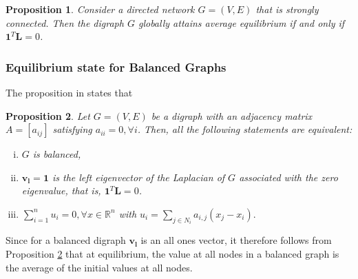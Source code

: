 \documentclass[10pt,a4paper]{article}
\newtheorem{prop}{Proposition}
\begin{document}
    \begin{prop}
    Consider a directed network $G=(V,E)$ that is strongly connected. Then the digraph $G$ globally attains average equilibrium if and only if $\mathbf{1}^T \mathbf{L}= 0$.
    \label{prop1}
    \end{prop} 

    \subsubsection{Equilibrium state for Balanced Graphs}
     The proposition in \citep{saber2003agreement} states that 
     \begin{prop}
     Let $G=(V,E)$ be a digraph with an adjacency matrix $A=[a_{ij}]$ satisfying $a_{ii}=0, \forall i$. Then, all the following statements are equivalent:
     \begin{enumerate}[i)]
     	\item $G$ is balanced,
     	\item $\mathbf{v_l}= \mathbf{1}$ is the left eigenvector of the Laplacian of $G$ associated with the zero eigenvalue, that is, $\mathbf{1}^T \mathbf{L} = 0$.
     	\item $\sum_{i=1} ^ n u_i = 0, \forall x \in  \mathbb{R}^n$ with $u_i = \sum_{j \in N_i} a_{i,j} (x_j -x_i).$
     \end{enumerate}
     \label{prop1}
     \end{prop}
 
      Since for a balanced digraph $\mathbf{v_l}$ is an all ones vector, it therefore follows from Proposition \ref{prop1} that at equilibrium, the value at all nodes in a balanced graph is the average of the initial values at all nodes.
      
\end{document}
